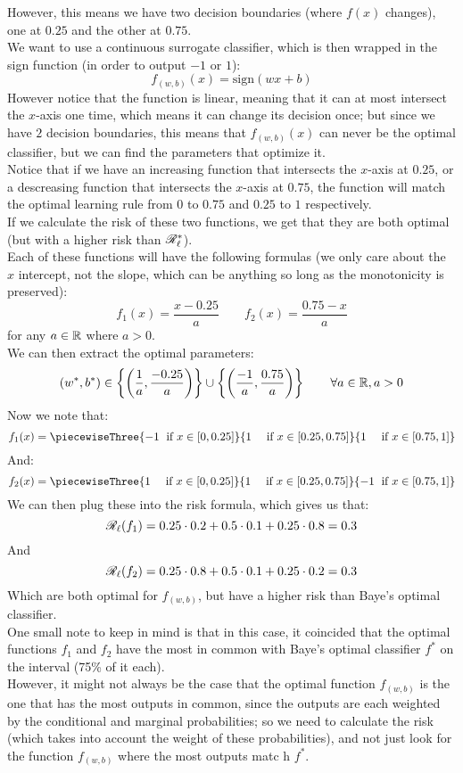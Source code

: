\documentclass[12pt]{article}
\begin{document}
\begin{enumerate}[label = \alph*)]
However, this means we have two
decision boundaries (where $f(x)$
changes),
one at $0.25$ and the other at $0.75$. \\
We want to use a continuous
surrogate classifier,
which is then wrapped in the sign function
(in order to output $-1$ or $1$):
\[ f_{(w, b)}(x) = \text{sign}(wx + b) \]
However notice that the function is
linear, meaning that it can at most
intersect the $x$-axis one time,
which means it can change its decision
once;
but since we have $2$ decision boundaries,
this means that $f_{(w, b)}(x)$
can never be the optimal classifier,
but we can find the parameters that
optimize it. \\
Notice that if we have 
an increasing function that intersects
the $x$-axis at $0.25$,
or a descreasing function
that intersects
the $x$-axis at $0.75$,
the function will match the optimal
learning rule from $0$ to $0.75$
and $0.25$ to $1$ respectively. \\
If we calculate the risk of these
two functions, we get that they are
both optimal (but with a higher risk
than $\mathscr{R}_\ell^*$). \\
Each of these functions will have the
following formulas
(we only care about the $x$
intercept, not the slope,
which can be anything so long
as the monotonicity is preserved):
\[ f_1(x) = \dfrac{x-0.25}{a} \qquad
f_2(x) = \dfrac{0.75 - x}{a} \]
for any $a \in \mathbb{R}$ where $a > 0$. \\
We can then extract the optimal
parameters:
\[ (w^*, b^*) \in
\left\{ \left( \dfrac{1}{a}, \dfrac{-0.25}{a} \right) \right\}
\cup
\left\{ \left( \dfrac{-1}{a}, \dfrac{0.75}{a} \right) \right\}
\qquad \forall a \in \mathbb{R}, a > 0 \]
Now we note that:
\[ f_1(x)
= \piecewiseThree
{-1 \; \text{ if } x \in [0, 0.25]}
{1 \quad \text{ if } x \in [0.25, 0.75]}
{1 \quad \text{ if } x \in [0.75, 1]} \]
And:
\[ f_2(x)
= \piecewiseThree
{1 \quad \text{ if } x \in [0, 0.25]}
{1 \quad \text{ if } x \in [0.25, 0.75]}
{-1 \; \text{ if } x \in [0.75, 1]} \]
We can then plug these into
the risk formula,
which gives us that:
\[ \mathscr{R}_\ell(f_1)
= 0.25 \cdot 0.2 + 0.5 \cdot 0.1
+ 0.25 \cdot 0.8 = 0.3 \]
And
\[ \mathscr{R}_\ell(f_2)
= 0.25 \cdot 0.8 + 0.5 \cdot 0.1
+ 0.25 \cdot 0.2 = 0.3 \]
Which are both optimal
for $f_{(w, b)}$,
but have a higher risk than
Baye's optimal classifier. \\
One small note to keep in mind is that
in this case, it coincided that the
optimal functions $f_1$
and $f_2$ have the most
in common with Baye's optimal
classifier $f^*$
on the interval (75\% of it each). \\
However, it might not always be the case
that the optimal function
$f_{(w, b)}$
is the one that has the most
outputs in common,
since the outputs are each
weighted by the conditional and marginal
probabilities;
so we need to calculate the risk
(which takes into account
the weight of these probabilities),
and not just look for the function
$f_{(w, b)}$ where the most outputs
matc h $f^*$. 
\end{enumerate}
\end{document}
